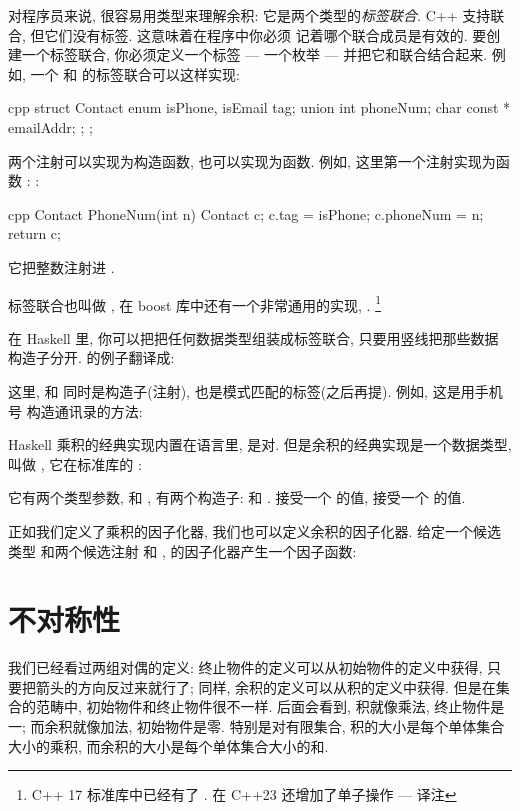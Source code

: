 对程序员来说, 很容易用类型来理解余积: 它是两个类型的\emph{标签联合}. C++ 支持联合, 但它们没有标签. 这意味着在程序中你必须
记着哪个联合成员是有效的. 要创建一个标签联合, 你必须定义一个标签 --- 一个枚举 --- 并把它和联合结合起来. 例如, 一个
 和  的标签联合可以这样实现:

\begin{snip}{cpp}
struct Contact {
    enum { isPhone, isEmail } tag;
    union { int phoneNum; char const * emailAddr; };
};
\end{snip}
两个注射可以实现为构造函数, 也可以实现为函数. 例如, 这里第一个注射实现为函数 :
:

\begin{snip}{cpp}
Contact PhoneNum(int n) {
    Contact c;
    c.tag = isPhone;
    c.phoneNum = n;
    return c;
}
\end{snip}
它把整数注射进 .

标签联合也叫做 , 在 boost 库中还有一个非常通用的实现, .
\footnote{C++ 17 标准库中已经有了 . 在 C++23 还增加了单子操作 --- 译注}

在 Haskell 里, 你可以把把任何数据类型组装成标签联合, 只要用竖线把那些数据构造子分开.  的例子翻译成:

这里,  和  同时是构造子(注射), 也是模式匹配的标签(之后再提). 例如, 这是用手机号
构造通讯录的方法:

Haskell 乘积的经典实现内置在语言里, 是对. 但是余积的经典实现是一个数据类型, 叫做 , 它在标准库的 :

它有两个类型参数,  和 , 有两个构造子:  和 .  接受一个  的值,
 接受一个  的值.

正如我们定义了乘积的因子化器, 我们也可以定义余积的因子化器. 给定一个候选类型  和两个候选注射  和 ,
 的因子化器产生一个因子函数:


\section{不对称性}

我们已经看过两组对偶的定义: 终止物件的定义可以从初始物件的定义中获得, 只要把箭头的方向反过来就行了;
同样, 余积的定义可以从积的定义中获得. 但是在集合的范畴中, 初始物件和终止物件很不一样. 后面会看到,
积就像乘法, 终止物件是一; 而余积就像加法, 初始物件是零. 特别是对有限集合, 积的大小是每个单体集合大小的乘积,
而余积的大小是每个单体集合大小的和.

